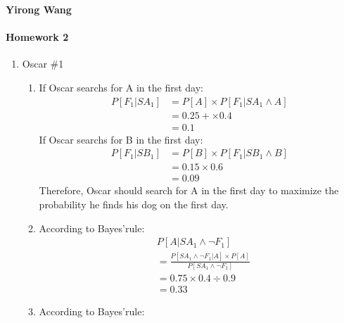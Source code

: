\documentclass[11pt]{article}
\theoremstyle{definition}
\begin{document}
\renewcommand{\labelenumii}{{\bfseries \em \arabic{enumi}.\arabic{enumii}}}
\newcommand{\problemitem}{\renewcommand{\labelenumi}{{\bfseries \em Problem \arabic{enumi}}}\item}
\newcommand{\solutionitem}{\renewcommand{\labelenumi}{{\bfseries \em Solution \arabic{enumi}}}\addtocounter{enumi}{-1}\item}
\newenvironment{solution}{\par\color{DarkBlue}}{\par}
{\noindent \textbf{Yirong Wang} }

\paragraph{Homework 2}
\begin{enumerate}[leftmargin=0pt, itemsep=3ex]

    \problemitem Oscar \#1
        \begin{enumerate}
        \item 
        If Oscar searchs for A in the first day:
        \\
        \begin{align*}
            P[F_1|SA_1] &= P[A] \times P[F_1|SA_1 \land A]
            \\ &= 0.25 +\times 0.4
            \\ &= 0.1
        \end{align*}
        If Oscar searchs for B in the first day:
        \begin{align*}
            P[F_1|SB_1] &=P[B] \times P[F_1|SB_1\land B]
            \\ &= 0.15 \times 0.6
            \\ &= 0.09
        \end{align*}
        Therefore, Oscar should search for A in the first day to maximize the 
        probability he finds his dog on the first day.
    \item According to Bayes'rule:
    \\
    \begin{align*}
        & P[A | SA_1 \land \neg F_1] 
    \\& = \frac{P[SA_1 \land \neg F_1 | A] \times P[A]}{P[SA_1 \land \neg F_1]}
    \\& = 0.75 \times 0.4 \div 0.9
    \\& = 0.33
    \end{align*}
    

    \item 
    According to Bayes'rule:



\end{enumerate}
\end{enumerate}
\end{document}
